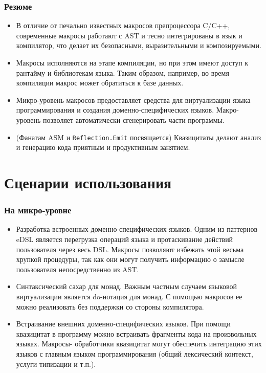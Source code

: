 \documentclass{beamer}
\begin{document}
\begin{frame}[t]
\frametitle{Резюме}
\begin{itemize}
\item В отличие от печально известных макросов препроцессора C/C++, современные макросы работают с AST и тесно интегрированы в язык и компилятор, что делает их безопасными, выразительными и композируемыми.
\item Макросы исполняются на этапе компиляции, но при этом имеют доступ к рантайму и библиотекам языка. Таким образом, например, во время компиляции макрос может обратиться к базе данных.
\item Микро-уровень макросов предоставляет средства для виртуализации языка программирования и создания доменно-специфических языков. Макро-уровень позволяет автоматически сгенерировать части программы.
\item (Фанатам ASM и \texttt{Reflection.Emit} посвящается) Квазицитаты делают анализ и генерацию кода приятным и продуктивным занятием.
\end{itemize}
\end{frame}

\section{Сценарии использования}

\begin{frame}[t]
\frametitle{На микро-уровне}
\begin{itemize}
\item Разработка встроенных доменно-специфических языков. Одним из паттернов eDSL является перегрузка операций языка и протаскивание действий пользователя через весь DSL. Макросы позволяют избежать этой весьма хрупкой процедуры, так как они могут получить информацию о замысле пользователя непосредственно из AST.
\item Синтаксический сахар для монад. Важным частным случаем языковой виртуализации является do-нотация для монад. С помощью макросов ее можно реализовать без поддержки со стороны компилятора.
\item Встраивание внешних доменно-специфических языков. При помощи квазицитат в программу можно встраивать фрагменты кода на произвольных языках. Макросы- обработчики квазицитат могут обеспечить интеграцию этих языков с главным языком программирования (общий лексический контекст, услуги типизации и т.п.).
\end{itemize}
\end{frame}
\end{document}
